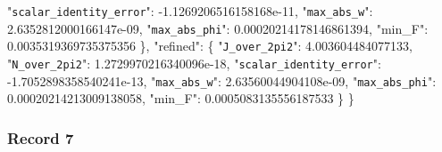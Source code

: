 \documentclass[
  10pt,
]{article}
\newenvironment{Shaded}{}{}
\newcommand{\DataTypeTok}[1]{\textcolor[rgb]{0.56,0.13,0.00}{#1}}
\newcommand{\FloatTok}[1]{\textcolor[rgb]{0.25,0.63,0.44}{#1}}
\newcommand{\FunctionTok}[1]{\textcolor[rgb]{0.02,0.16,0.49}{#1}}
\begin{document}
\begin{Shaded}
\begin{Highlighting}[]
    \DataTypeTok{"\nolinkurl{scalar_identity_error}"}\FunctionTok{:} \FloatTok{{-}1.1269206516158168e{-}11}\FunctionTok{,}
    \DataTypeTok{"\nolinkurl{max_abs_w}"}\FunctionTok{:} \FloatTok{2.6352812000166147e{-}09}\FunctionTok{,}
    \DataTypeTok{"\nolinkurl{max_abs_phi}"}\FunctionTok{:} \FloatTok{0.00020214178146861394}\FunctionTok{,}
    \DataTypeTok{"min\_F"}\FunctionTok{:} \FloatTok{0.0035319369735375356}
  \FunctionTok{\},}
  \DataTypeTok{"refined"}\FunctionTok{:} \FunctionTok{\{}
    \DataTypeTok{"\nolinkurl{J_over_2pi2}"}\FunctionTok{:} \FloatTok{4.003604484077133}\FunctionTok{,}
    \DataTypeTok{"\nolinkurl{N_over_2pi2}"}\FunctionTok{:} \FloatTok{1.2729970216340096e{-}18}\FunctionTok{,}
    \DataTypeTok{"\nolinkurl{scalar_identity_error}"}\FunctionTok{:} \FloatTok{{-}1.7052898358540241e{-}13}\FunctionTok{,}
    \DataTypeTok{"\nolinkurl{max_abs_w}"}\FunctionTok{:} \FloatTok{2.63560044904108e{-}09}\FunctionTok{,}
    \DataTypeTok{"\nolinkurl{max_abs_phi}"}\FunctionTok{:} \FloatTok{0.00020214213009138058}\FunctionTok{,}
    \DataTypeTok{"min\_F"}\FunctionTok{:} \FloatTok{0.0005083135556187533}
  \FunctionTok{\}}
\FunctionTok{\}}
\end{Highlighting}
\end{Shaded}

\hypertarget{record-7-1}{%
\subsubsection{Record 7}\label{record-7-1}}
\end{document}
